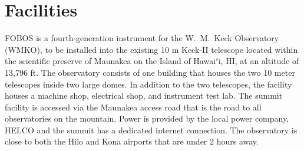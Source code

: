\documentclass[oneside,11pt]{amsart}
\newcommand{\hawaii}{Hawaiʻi}
\begin{document}



\section{Facilities}


FOBOS is a fourth-generation instrument for the W.~M.\ Keck
Observatory (WMKO), to be installed into the existing 10 m Keck-II
telescope located within the scientific preserve of Maunakea on the
Island of \hawaii, HI, at an altitude of 13,796 ft. The observatory
consists of one building that houses the two 10 meter telescopes
inside two large domes. In addition to the two telescopes, the
facility houses a machine shop, electrical shop, and instrument test
lab. The summit facility is accessed via the Maunakea access road
that is the road to all observatories on the mountain. Power is
provided by the local power company, HELCO and the summit has a
dedicated internet connection. The observatory is close to both the
Hilo and Kona airports that are under 2 hours away.
\end{document}

